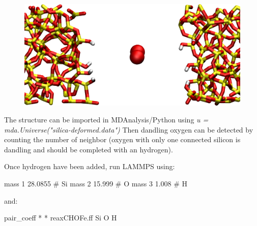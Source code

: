 \begin{figure}
\includegraphics[width=\linewidth]{tutorials/level3/reactive-silicon-dioxide/exercice-light.png}
\end{figure}

\begin{tcolorbox}[colback=mylightblue!5!white,colframe=mylightblue!75!black,title=Hint n°1]
The structure can be imported in MDAnalysis/Python using \textit{u = mda.Universe("silica-deformed.data")}
Then dandling oxygen can be detected by counting the number of neighbor (oxygen with only 
one connected silicon is dandling and should be completed with an hydrogen).
\end{tcolorbox}

\noindent \begin{tcolorbox}[colback=mylightblue!5!white,colframe=mylightblue!75!black,title=Hint n°2]
Once hydrogen have been added, run LAMMPS using:
\begin{lcverbatim}
mass 1 28.0855 # Si
mass 2 15.999 # O
mass 3 1.008 # H
\end{lcverbatim}

\noindent and:
\begin{lcverbatim}
pair_coeff * * reaxCHOFe.ff Si O H
\end{lcverbatim}

\noindent \end{tcolorbox}

